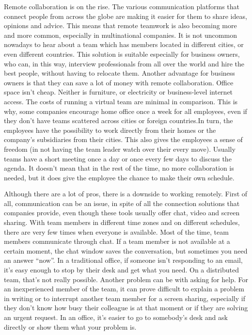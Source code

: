 Remote collaboration is on the rise. The various communication platforms that connect people from across the globe are making it easier for them to share ideas, opinions and advice. This means that remote teamwork is also becoming more and more common, especially in multinational companies. It is not uncommon nowadays to hear about a team which has members located in different cities, or even different countries.  This solution is suitable especially for business owners, who can, in this way, interview professionals from all over the world and hire the best people, without having to relocate them. Another advantage for business owners is that they can save a lot of money with remote collaboration. Office space isn’t cheap. Neither is furniture, or electricity or business-level internet access. The costs of running a virtual team are minimal in comparison. This is why, some companies encourage home office once a week for all employees, even if they don’t have teams scattered across cities or foreign countries.In turn, the employees have the possibility to work directly from their homes or the company’s subsidiaries from their cities. This also gives the employees a sense of freedom (in not having the team leader watch over their every move). Usually teams have a short meeting once a day or once every few days to discuss the agenda.  It doesn’t mean that in the rest of the time, no more collaboration is needed, but it does give the employee the chance to make their own schedule. 
\par
Although there are a lot of pros, there is a downside to working remotely. First of all, communication can be an issue, in spite of all the connection solutions that companies provide, even though these tools usually offer chat, video and screen sharing. With team members in different time zones and on different schedules, there are very few times when everyone is available. Most of the time, team members communicate through chat. If a team member is not available at a certain moment, the chat window saves the conversation, but sometimes you need an answer “now”.  In a traditional office, if someone isn’t responding to an email, it’s easy enough to stop by their desk and get what you need. On a distributed team, that’s not really possible. Another problem can be with asking for help. For an inexperienced member of the team, it can prove difficult to explain a problem in writing or to interrupt another team member for a screen sharing, especially if they don’t know how busy their colleague is at that moment or if they are solving an urgent request.  In an office, it’s easier to go to somebody’s desk and ask directly or show them what your problem is. 
